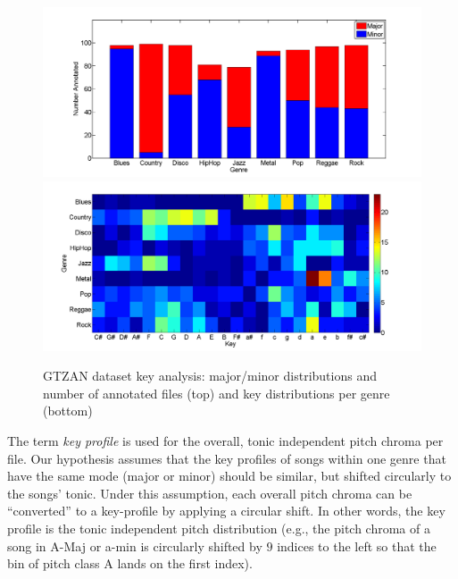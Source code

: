 \documentclass{article}
\begin{document}

\begin{figure}[tb]
    \vspace{-3mm}\includegraphics[scale=.22]{graph/annotated}
    \includegraphics[scale=.22]{graph/key_distribution_colour_legend}
    \caption{GTZAN dataset key analysis: major/minor distributions and number of annotated files (top) and key distributions per genre (bottom)}\label{fig:KeyDistributionPerGenre}
\end{figure}


The term \textit{key profile} is used for the overall, tonic independent pitch chroma per file. Our hypothesis assumes that the key profiles of songs within one genre that have the same mode (major or minor) should be similar, but shifted circularly to the songs' tonic. Under this assumption, each overall pitch chroma can be ``converted'' to a key-profile by applying a circular shift. In other words, the key profile is the tonic independent pitch distribution (e.g., the pitch chroma of a song in A-Maj or a-min is circularly shifted by $9$ indices to the left so that the bin of pitch class A lands on the first index).
\end{document}

